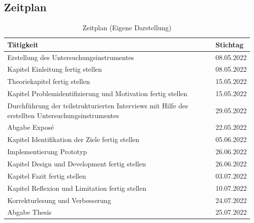 \documentclass[12pt, oneside]{article}
\begin{document}
\subsection*{Zeitplan}

\begin{table}[ht]
\begin{tabular}{@{}p{13cm}p{2cm}@{}}
\toprule
\textbf{Tätigkeit}                                                                                & \textbf{Stichtag} \\ \midrule
Erstellung des Untersuchungsinstrumentes                                                          & 08.05.2022        \\ \midrule
Kapitel Einleitung fertig stellen                                                                 & 08.05.2022        \\ \midrule
Theoriekapitel fertig stellen & 15.05.2022        \\ \midrule
Kapitel Problemidentifizierung und Motivation fertig stellen                                      & 15.05.2022        \\ \midrule
Durchführung der teilstrukturierten Interviews mit Hilfe des erstellten Untersuchungsinstrumentes & 29.05.2022        \\ \midrule
Abgabe Exposé                                                                                     & 22.05.2022        \\ \midrule
Kapitel Identifikation der Ziele fertig stellen                                                   & 05.06.2022        \\ \midrule
Implementierung Prototyp                                                                          & 26.06.2022        \\ \midrule
Kapitel Design und Development fertig stellen                                                     & 26.06.2022        \\ \midrule
Kapitel Fazit fertig stellen                                                                      & 03.07.2022        \\ \midrule
Kapitel Reflexion und Limitation fertig stellen                                                   & 10.07.2022        \\ \midrule
Korrekturlesung und Verbesserung                                                                  & 24.07.2022        \\ \midrule
Abgabe Thesis                                                                                     & 25.07.2022        \\ \bottomrule
\end{tabular}
\caption{\label{tab:time-table}Zeitplan (Eigene Darstellung)}
\end{table}
\end{document}
